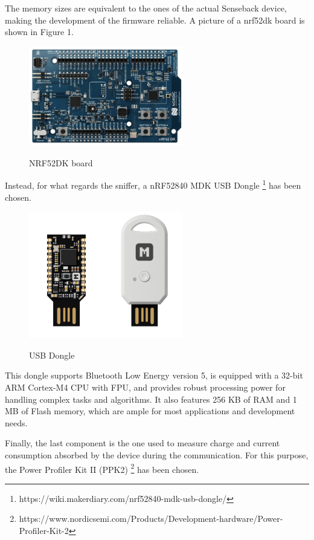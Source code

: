 \documentclass{Configuration_Files/PoliMi3i_thesis}
\begin{document}
The memory sizes are equivalent to the ones of the actual Senseback device, making the development of the firmware reliable. A picture of a nrf52dk board is shown in Figure 1.

\begin{figure}[H]
    \centering
    \includegraphics[width=0.6\textwidth]{Materials/figure2}
    \label{materials_2}
    \caption{NRF52DK board}
\end{figure}

Instead, for what regards the sniffer, a nRF52840 MDK USB Dongle \footnote{https://wiki.makerdiary.com/nrf52840-mdk-usb-dongle/} has been chosen.

\begin{figure}[H]
    \centering
    \includegraphics[width=0.6\textwidth]{Materials/figure3}
    \label{materials_3}
    \caption{USB Dongle}
\end{figure}

This dongle supports Bluetooth Low Energy version 5, is equipped with a 32-bit ARM Cortex-M4 CPU with FPU, and provides robust processing power for handling complex tasks and algorithms. It also features 256 KB of RAM and 1 MB of Flash memory, which are ample for most applications and development needs.

Finally, the last component is the one used to measure charge and current consumption absorbed by the device during the communication. For this purpose, the Power Profiler Kit II (PPK2) \footnote{https://www.nordicsemi.com/Products/Development-hardware/Power-Profiler-Kit-2} has been chosen.
\end{document}
